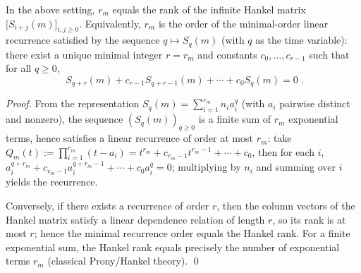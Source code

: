 \begin{theorem}\label{thm:pom-fiber-spectrum-prony-hankel-rank}
In the above setting, \(r_m\) equals the rank of the infinite Hankel matrix \(\bigl[S_{i+j}(m)\bigr]_{i,j\ge 0}\).
Equivalently, \(r_m\) is the order of the minimal-order linear recurrence satisfied by the sequence \(q\mapsto S_q(m)\) (with \(q\) as the time variable):
there exist a unique minimal integer \(r=r_m\) and constants \(c_0,\dots,c_{r-1}\) such that for all \(q\ge 0\),
\[
\boxed{\;
S_{q+r}(m)+c_{r-1}S_{q+r-1}(m)+\cdots+c_0 S_q(m)=0\; }.
\]
\end{theorem}
\begin{proof}
From the representation \(S_q(m)=\sum_{i=1}^{r_m}n_i a_i^q\) (with \(a_i\) pairwise distinct and nonzero), the sequence \((S_q(m))_{q\ge 0}\) is a finite sum of \(r_m\) exponential terms,
hence satisfies a linear recurrence of order at most \(r_m\): take
\(
Q_m(t):=\prod_{i=1}^{r_m}(t-a_i)=t^{r_m}+c_{r_m-1}t^{r_m-1}+\cdots+c_0
\),
then for each \(i\), \(a_i^{q+r_m}+c_{r_m-1}a_i^{q+r_m-1}+\cdots+c_0 a_i^q=0\);
multiplying by \(n_i\) and summing over \(i\) yields the recurrence.
\par
Conversely, if there exists a recurrence of order \(r\), then the column vectors of the Hankel matrix satisfy a linear dependence relation of length \(r\), so its rank is at most \(r\);
hence the minimal recurrence order equals the Hankel rank.
For a finite exponential sum, the Hankel rank equals precisely the number of exponential terms \(r_m\) (classical Prony/Hankel theory). \qed
\end{proof}

